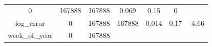 \documentclass[]{book}
\theoremstyle{definition}
\theoremstyle{definition}
\theoremstyle{definition}
\theoremstyle{remark}
\begin{document}
\begin{longtable}[]{@{}ccccccc@{}}
\begin{minipage}[t]{0.11\columnwidth}
0\strut
\end{minipage} & \begin{minipage}[t]{0.12\columnwidth}\centering\strut
167888\strut
\end{minipage} & \begin{minipage}[t]{0.10\columnwidth}\centering\strut
167888\strut
\end{minipage} & \begin{minipage}[t]{0.11\columnwidth}\centering\strut
0.069\strut
\end{minipage} & \begin{minipage}[t]{0.09\columnwidth}\centering\strut
0.15\strut
\end{minipage} & \begin{minipage}[t]{0.09\columnwidth}\centering\strut
0\strut
\end{minipage}\tabularnewline
\begin{minipage}[t]{0.20\columnwidth}\centering\strut
log\_error\strut
\end{minipage} & \begin{minipage}[t]{0.11\columnwidth}\centering\strut
0\strut
\end{minipage} & \begin{minipage}[t]{0.12\columnwidth}\centering\strut
167888\strut
\end{minipage} & \begin{minipage}[t]{0.10\columnwidth}\centering\strut
167888\strut
\end{minipage} & \begin{minipage}[t]{0.11\columnwidth}\centering\strut
0.014\strut
\end{minipage} & \begin{minipage}[t]{0.09\columnwidth}\centering\strut
0.17\strut
\end{minipage} & \begin{minipage}[t]{0.09\columnwidth}\centering\strut
-4.66\strut
\end{minipage}\tabularnewline
\begin{minipage}[t]{0.20\columnwidth}\centering\strut
week\_of\_year\strut
\end{minipage} & \begin{minipage}[t]{0.11\columnwidth}\centering\strut
0\strut
\end{minipage} & \begin{minipage}[t]{0.12\columnwidth}\centering\strut
167888\strut
\end{minipage} & \begin{minipage}[t]{0.10\columnwidth}\centering\strut

\end{minipage}
\end{longtable}
\end{document}
